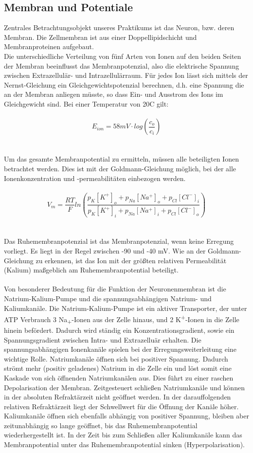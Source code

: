 \documentclass[a4paper]{article}
\begin{document}
\subsection{Membran und Potentiale}
Zentrales Betrachtungsobjekt unseres Praktikums ist das Neuron, bzw. deren Membran. Die Zellmembran ist aus einer Doppellipidschicht und Membranproteinen aufgebaut.\\
Die unterschiedliche Verteilung von fünf Arten von Ionen auf den beiden Seiten der Membran beeinflusst das Membranpotenzial, also die elektrische Spannung zwischen Extrazellulär- und Intrazellulärraum. Für jedes Ion lässt sich mittels der Nernst-Gleichung ein Gleichgewichtspotenzial berechnen, d.h. eine Spannung die an der Membran anliegen müsste, so dass Ein- und Ausstrom des Ions im Gleichgewicht sind. Bei einer Temperatur von 20\textdegree{}C gilt: \\ \\
\[E_{ion} = 58mV \cdot log\left(\frac{c_o}{c_i}\right)\] \\ \\
Um das gesamte Membranpotential zu ermitteln, müssen alle beteiligten Ionen betrachtet werden. Dies ist mit der Goldmann-Gleichung möglich, bei der alle Ionenkonzentration und -permeabilitäten einbezogen werden. \\ \\
\[V_m = \frac{RT}{F}ln\left(\frac{p_K[K^+]_o + p_{Na}[Na^+]_o + p_{Cl}[Cl^-]_i}{p_K[K^+]_i + p_{Na}[Na^+]_i + p_{Cl}[Cl^-]_o}\right)\] \\ \\
Das Ruhemembranpotenzial ist das Membranpotenzial, wenn keine Erregung vorliegt. Es liegt in der Regel zwischen -90 und -40 mV. Wie an der Goldmann-Gleichung zu erkennen, ist das Ion mit der größten relativen Permeabilität (Kalium) maßgeblich am Ruhemembranpotential beteiligt.\\ \\
Von besonderer Bedeutung für die Funktion der Neuronenmembran ist die Natrium-Kalium-Pumpe und die spannungsabhängigen Natrium- und Kaliumkanäle. Die Natrium-Kalium-Pumpe ist ein aktiver Transporter, der unter ATP Verbrauch 3 Na\textsubscript{+}-Ionen aus der Zelle hinaus, und 2 K\textsuperscript{+}-Ionen in die Zelle hinein befördert. Dadurch wird ständig ein Konzentrationsgradient, sowie ein Spannungsgradient zwischen Intra- und Extrazelluär erhalten. Die spannungsabhängigen Ionenkanäle spielen bei der Erregungsweiterleitung eine wichtige Rolle. Natriumkanäle öffnen sich bei positiver Spannung. Dadurch strömt mehr (positiv geladenes) Natrium in die Zelle ein und löst somit eine Kaskade von sich öffnenden Natriumkanälen aus. Dies führt zu einer raschen Depolarisation der Membran. Zeitgesteuert schließen Natriumkanäle und können in der absoluten Refraktärzeit nicht geöffnet werden. In der darauffolgenden relativen Refraktärzeit liegt der Schwellwert für die Öffnung der Kanäle höher.\cite{CatterallWilliamA2000FICt} Kaliumkanäle öffnen sich ebenfalls abhängig von positiver Spannung, bleiben aber zeitunabhängig so lange geöffnet, bis das Ruhemembranpotential wiederhergestellt ist. In der Zeit bis zum Schließen aller Kaliumkanäle kann das Membranpotential unter das Ruhemembranpotential sinken (Hyperpolarisation).\cite{FaberESLouise2003CPCM} 
\end{document}
